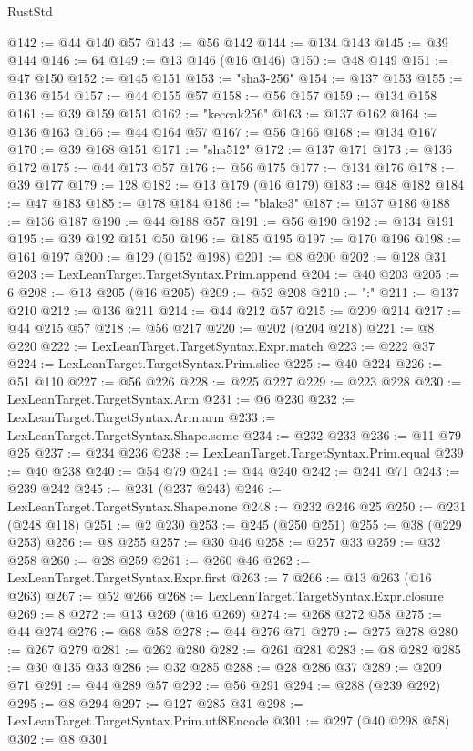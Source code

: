 \begin{lexlean}{RustStd}
\begin{coremodule}
@142 := @44 @140 @57
@143 := @56 @142
@144 := @134 @143
@145 := @39 @144
@146 := 64
@149 := @13 @146 (@16 @146)
@150 := @48 @149
@151 := @47 @150
@152 := @145 @151
@153 := "sha3-256"
@154 := @137 @153
@155 := @136 @154
@157 := @44 @155 @57
@158 := @56 @157
@159 := @134 @158
@161 := @39 @159 @151
@162 := "keccak256"
@163 := @137 @162
@164 := @136 @163
@166 := @44 @164 @57
@167 := @56 @166
@168 := @134 @167
@170 := @39 @168 @151
@171 := "sha512"
@172 := @137 @171
@173 := @136 @172
@175 := @44 @173 @57
@176 := @56 @175
@177 := @134 @176
@178 := @39 @177
@179 := 128
@182 := @13 @179 (@16 @179)
@183 := @48 @182
@184 := @47 @183
@185 := @178 @184
@186 := "blake3"
@187 := @137 @186
@188 := @136 @187
@190 := @44 @188 @57
@191 := @56 @190
@192 := @134 @191
@195 := @39 @192 @151 @50
@196 := @185 @195
@197 := @170 @196
@198 := @161 @197
@200 := @129 (@152 @198)
@201 := @8 @200
@202 := @128 @31
@203 := LexLeanTarget.TargetSyntax.Prim.append
@204 := @40 @203
@205 := 6
@208 := @13 @205 (@16 @205)
@209 := @52 @208
@210 := ":"
@211 := @137 @210
@212 := @136 @211
@214 := @44 @212 @57
@215 := @209 @214
@217 := @44 @215 @57
@218 := @56 @217
@220 := @202 (@204 @218)
@221 := @8 @220
@222 := LexLeanTarget.TargetSyntax.Expr.match
@223 := @222 @37
@224 := LexLeanTarget.TargetSyntax.Prim.slice
@225 := @40 @224
@226 := @51 @110
@227 := @56 @226
@228 := @225 @227
@229 := @223 @228
@230 := LexLeanTarget.TargetSyntax.Arm
@231 := @6 @230
@232 := LexLeanTarget.TargetSyntax.Arm.arm
@233 := LexLeanTarget.TargetSyntax.Shape.some
@234 := @232 @233
@236 := @11 @79 @25
@237 := @234 @236
@238 := LexLeanTarget.TargetSyntax.Prim.equal
@239 := @40 @238
@240 := @54 @79
@241 := @44 @240
@242 := @241 @71
@243 := @239 @242
@245 := @231 (@237 @243)
@246 := LexLeanTarget.TargetSyntax.Shape.none
@248 := @232 @246 @25
@250 := @231 (@248 @118)
@251 := @2 @230
@253 := @245 (@250 @251)
@255 := @38 (@229 @253)
@256 := @8 @255
@257 := @30 @46
@258 := @257 @33
@259 := @32 @258
@260 := @28 @259
@261 := @260 @46
@262 := LexLeanTarget.TargetSyntax.Expr.first
@263 := 7
@266 := @13 @263 (@16 @263)
@267 := @52 @266
@268 := LexLeanTarget.TargetSyntax.Expr.closure
@269 := 8
@272 := @13 @269 (@16 @269)
@274 := @268 @272 @58
@275 := @44 @274
@276 := @68 @58
@278 := @44 @276 @71
@279 := @275 @278
@280 := @267 @279
@281 := @262 @280
@282 := @261 @281
@283 := @8 @282
@285 := @30 @135 @33
@286 := @32 @285
@288 := @28 @286 @37
@289 := @209 @71
@291 := @44 @289 @57
@292 := @56 @291
@294 := @288 (@239 @292)
@295 := @8 @294
@297 := @127 @285 @31
@298 := LexLeanTarget.TargetSyntax.Prim.utf8Encode
@301 := @297 (@40 @298 @58)
@302 := @8 @301

\end{coremodule}
\end{lexlean}
